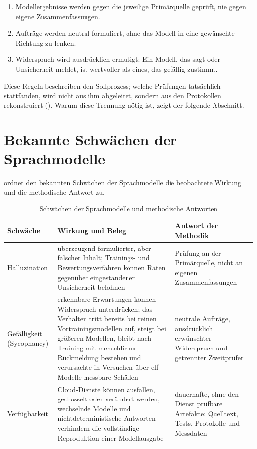 \begin{enumerate}
  \item Modellergebnisse werden gegen die jeweilige Primärquelle geprüft, nie gegen eigene Zusammenfassungen.
  \item Aufträge werden neutral formuliert, ohne das Modell in eine gewünschte Richtung zu lenken.
  \item Widerspruch wird ausdrücklich ermutigt: Ein Modell, das  sagt oder Unsicherheit meldet,
    ist wertvoller als eines, das gefällig zustimmt.
\end{enumerate}

Diese Regeln beschreiben den Sollprozess; welche Prüfungen tatsächlich stattfanden, wird nicht aus ihm
abgeleitet, sondern aus den Protokollen rekonstruiert (). Warum diese Trennung
nötig ist, zeigt der folgende Abschnitt.

\clearpage
\section{Bekannte Schwächen der Sprachmodelle}
\label{sec:gefahrenmodell}

 ordnet den bekannten Schwächen der Sprachmodelle die beobachtete
Wirkung und die methodische Antwort zu.

\begin{table}[H]
  \centering
  \caption{Schwächen der Sprachmodelle und methodische Antworten}
  \label{tab:sprachmodell-schwaechen}
  \small
  \begin{tabularx}{\textwidth}{@{}L{3.0cm}L{5.5cm}Y@{}}
    \toprule
    \textbf{Schwäche} & \textbf{Wirkung und Beleg} & \textbf{Antwort der Methodik} \\
    \midrule
    Halluzination
      & überzeugend formulierter, aber falscher Inhalt; Trainings- und Bewertungsverfahren können Raten
        gegenüber eingestandener Unsicherheit belohnen \cite{kalai2025hallucinate}
      & Prüfung an der Primärquelle, nicht an eigenen Zusammenfassungen \\
    Gefälligkeit (Sycophancy)
      & erkennbare Erwartungen können Widerspruch unterdrücken; das Verhalten tritt bereits bei reinen
        Vortrainingsmodellen auf, steigt bei größeren Modellen, bleibt nach Training mit menschlicher
        Rückmeldung bestehen und verursachte in Versuchen über elf Modelle messbare Schäden
        \cite{perez2022evals,cheng2026sycophancy}
      & neutrale Aufträge, ausdrücklich erwünschter Widerspruch und getrennter Zweitprüfer \\
    Verfügbarkeit
      & Cloud-Dienste können ausfallen, gedrosselt oder verändert werden; wechselnde Modelle und
        nichtdeterministische Antworten verhindern die vollständige Reproduktion einer Modellausgabe
      & dauerhafte, ohne den Dienst prüfbare Artefakte: Quelltext, Tests, Protokolle und Messdaten \\
    \bottomrule
  \end{tabularx}
\end{table}

